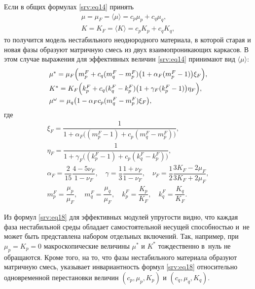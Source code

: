 Если в общих формулах \eqref{srv:eq14} принять
\begin{equation}
\begin{array}{ll}
\mu=\mu_{F}= \langle  {\mu}  \rangle =c_{p}\mu_{p}+c_{q}\mu_{q},\\[2mm]
K=K_{F}= \langle  {K}  \rangle =c_{p}K_{p}+c_{q}K_{q},
\end{array}
\end{equation}
то получится модель нестабильного неоднородного материала, в которой старая и новая фазы образуют матричную смесь из двух взаимопроникающих каркасов. В этом случае выражения для эффективных величин \eqref{srv:eq14} принимают вид $ \langle  {\mu}  \rangle $:
\begin{equation}\label{srv:eq18}
\begin{array}{ll}
\mu^{*}=\mu_{F}\Bigl(m_{p}^{F}+c_{q} (m_{q}^{F}-m_{p}^{F} ) 
\bigl(1+\alpha_{F} (m_{p}^{F}-1 ) \bigr) \xi_{F}\Bigr),\\[2mm]
K^{*}=K_{F} \Bigl(k_{p}^{F}+c_{q} (k_{q}^{F}-k_{p}^{F}) 
\bigl(1+\gamma_F (k_{p}^{F}-1)\bigr) \eta_F \Bigr),\\[2mm]
\mu^{\omega}=\mu_{q} \bigl(1-\alpha_F c_{p} (m_{q}^{F}-m_{p}^{F}) \xi_F \bigr),
\end{array}
\end{equation}
где
\begin{equation}
\begin{array}{c}
\xi_F=\dfrac{1}{1+\alpha_F \big( (m_{p}^{F}-1 )+c_{p} (m_{q}^{F}-m_{p}^{F})\big)},\\[2mm]
\eta_F=\dfrac{1}{1+\gamma_F \big( (k_{p}^{F}-1 )+c_{p} (k_{q}^{F}-k_{p}^{F})\big)},\\[2mm]
\alpha_F=\dfrac{2}{15} \dfrac{4-5\nu_F}{1-\nu_F},\quad \gamma=\dfrac{1}{3} \dfrac{1+\nu_F}{1-\nu_F}, \quad \nu_{F}=\dfrac{1}{2} \dfrac{3K_F-2\mu_F}{3K_F+2\mu_F},\\[2mm]
m_{p}^{F}=\dfrac{\mu_{p}}{\mu_F}, \quad m_{q}^{F}=\dfrac{\mu_{q}}{\mu_F}, \quad k_{p}^{F}=\dfrac{K_{p}}{K_F}, \quad k_{q}^{F}=\dfrac{K_{q}}{K_F}.
\end{array}
\end{equation}



Из формул \eqref{srv:eq18} для эффективных модулей упругости видно, что каждая фаза нестабильной среды обладает самостоятельной несущей способностью и~не может быть представлена набором отдельных включений. Так, например, при $\mu_{p}=K_{p}=0$ макроскопические величины $\mu^{*}$ и $K^{*}$ тождественно в~нуль не обращаются. Кроме того, на то, что фазы нестабильного материала образуют матричную смесь, указывает инвариантность формул \eqref{srv:eq18} относительно одновременной перестановки величин $ (c_{p}, \mu_{p}, K_{p}  )$ и $ (c_{q}, \mu_{q}, K_{q}  )$.

